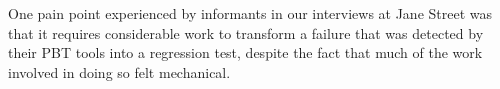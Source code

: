 


%
One pain
point experienced
by informants in our interviews at Jane Street was that it requires considerable work to
transform a failure that was detected by their PBT tools into a
regression test, despite the fact that much of the work involved in doing so
felt mechanical.


